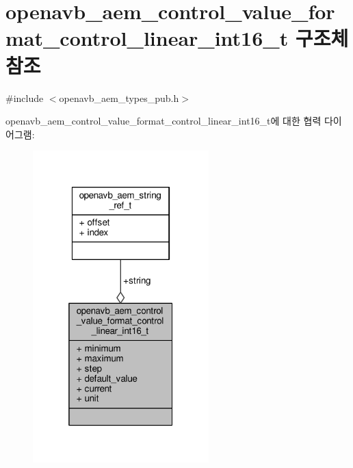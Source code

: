 \hypertarget{structopenavb__aem__control__value__format__control__linear__int16__t}{}\section{openavb\+\_\+aem\+\_\+control\+\_\+value\+\_\+format\+\_\+control\+\_\+linear\+\_\+int16\+\_\+t 구조체 참조}
\label{structopenavb__aem__control__value__format__control__linear__int16__t}


{\ttfamily \#include $<$openavb\+\_\+aem\+\_\+types\+\_\+pub.\+h$>$}



openavb\+\_\+aem\+\_\+control\+\_\+value\+\_\+format\+\_\+control\+\_\+linear\+\_\+int16\+\_\+t에 대한 협력 다이어그램\+:
\nopagebreak
\begin{figure}[H]
\begin{center}
\leavevmode
\includegraphics[width=193pt]{structopenavb__aem__control__value__format__control__linear__int16__t__coll__graph}
\end{center}
\end{figure}
